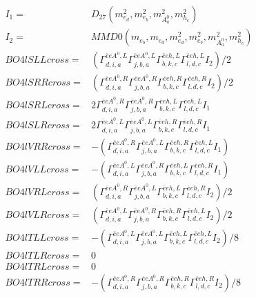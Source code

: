 \documentclass[A4,landscape]{article}
\begin{document}
\begin{align} 
I_1 = & D_{27}(m^2_{e_{{d}}}, m^2_{e_{{b}}}, m^2_{A^0_{{a}}}, m^2_{h_{{c}}}) \\ 
I_2 = & MMD0(m_{e_{{b}}}, m_{e_{{d}}}, m^2_{e_{{d}}}, m^2_{e_{{b}}}, m^2_{A^0_{{a}}}, m^2_{h_{{c}}}) \\ 
  BO4lSLLcross= & ( \Gamma^{\bar{e}e A^0 ,L}_{d, i, a} \Gamma^{\bar{e}e A^0 ,L}_{j, b, a} \Gamma^{\bar{e}e h ,L}_{b, k, c} \Gamma^{\bar{e}e h ,L}_{l, d, c} I_2)/2 \\ 
  BO4lSRRcross= & ( \Gamma^{\bar{e}e A^0 ,R}_{d, i, a} \Gamma^{\bar{e}e A^0 ,R}_{j, b, a} \Gamma^{\bar{e}e h ,R}_{b, k, c} \Gamma^{\bar{e}e h ,R}_{l, d, c} I_2)/2 \\ 
  BO4lSRLcross= & 2  \Gamma^{\bar{e}e A^0 ,R}_{d, i, a} \Gamma^{\bar{e}e A^0 ,R}_{j, b, a} \Gamma^{\bar{e}e h ,L}_{b, k, c} \Gamma^{\bar{e}e h ,L}_{l, d, c} I_1 \\ 
  BO4lSLRcross= & 2  \Gamma^{\bar{e}e A^0 ,L}_{d, i, a} \Gamma^{\bar{e}e A^0 ,L}_{j, b, a} \Gamma^{\bar{e}e h ,R}_{b, k, c} \Gamma^{\bar{e}e h ,R}_{l, d, c} I_1 \\ 
  BO4lVRRcross= & -( \Gamma^{\bar{e}e A^0 ,R}_{d, i, a} \Gamma^{\bar{e}e A^0 ,L}_{j, b, a} \Gamma^{\bar{e}e h ,R}_{b, k, c} \Gamma^{\bar{e}e h ,L}_{l, d, c} I_1) \\ 
  BO4lVLLcross= & -( \Gamma^{\bar{e}e A^0 ,L}_{d, i, a} \Gamma^{\bar{e}e A^0 ,R}_{j, b, a} \Gamma^{\bar{e}e h ,L}_{b, k, c} \Gamma^{\bar{e}e h ,R}_{l, d, c} I_1) \\ 
  BO4lVRLcross= & ( \Gamma^{\bar{e}e A^0 ,R}_{d, i, a} \Gamma^{\bar{e}e A^0 ,L}_{j, b, a} \Gamma^{\bar{e}e h ,L}_{b, k, c} \Gamma^{\bar{e}e h ,R}_{l, d, c} I_2)/2 \\ 
  BO4lVLRcross= & ( \Gamma^{\bar{e}e A^0 ,L}_{d, i, a} \Gamma^{\bar{e}e A^0 ,R}_{j, b, a} \Gamma^{\bar{e}e h ,R}_{b, k, c} \Gamma^{\bar{e}e h ,L}_{l, d, c} I_2)/2 \\ 
  BO4lTLLcross= & -( \Gamma^{\bar{e}e A^0 ,L}_{d, i, a} \Gamma^{\bar{e}e A^0 ,L}_{j, b, a} \Gamma^{\bar{e}e h ,L}_{b, k, c} \Gamma^{\bar{e}e h ,L}_{l, d, c} I_2)/8 \\ 
  BO4lTLRcross= & 0 \\ 
  BO4lTRLcross= & 0 \\ 
  BO4lTRRcross= & -( \Gamma^{\bar{e}e A^0 ,R}_{d, i, a} \Gamma^{\bar{e}e A^0 ,R}_{j, b, a} \Gamma^{\bar{e}e h ,R}_{b, k, c} \Gamma^{\bar{e}e h ,R}_{l, d, c} I_2)/8 \\ 
\end{align} 
\end{document}
